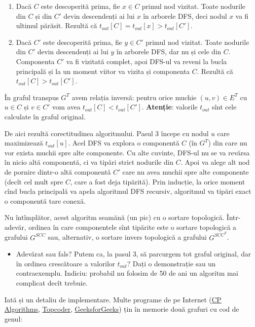 \documentclass[../main.tex]{subfiles}
\begin{document}
\begin{enumerate}
  \item Dacă $C$ este descoperită prima, fie $x \in C$ primul nod vizitat. Toate nodurile din $C$ și din $C'$ devin descendenți ai lui $x$ în arborele DFS, deci nodul $x$ va fi ultimul părăsit. Rezultă că $t_{out}[C] = t_{out}[x] > t_{out}[C']$.

  \item Dacă $C'$ este descoperită prima, fie $y \in C'$ primul nod vizitat. Toate nodurile din $C'$ devin descendenți ai lui $y$ în arborele DFS, dar nu și cele din $C$. Componenta $C'$ va fi vizitată complet, apoi DFS-ul va reveni la bucla principală și la un moment viitor va vizita și componenta $C$. Rezultă că $t_{out}[C] > t_{out}[C']$.
\end{enumerate}

În graful transpus $G^{T}$ avem relația inversă: pentru orice muchie $(u, v) \in E^{T}$ cu $u \in C$ și $v \in C'$ vom avea $t_{out}[C] < t_{out}[C']$. \textbf{Atenție}: valorile $t_{out}$ sînt cele calculate în graful original.

De aici rezultă corectitudinea algoritmului. Pasul 3 începe cu nodul $u$ care maximizează $t_{out}[u]$. Acel DFS va explora o componentă $C$ (în $G^T$) din care nu vor exista muchii spre alte componente. Cu alte cuvinte, DFS-ul nu se va revărsa în nicio altă componentă, ci va tipări strict nodurile din $C$. Apoi va alege alt nod de pornire dintr-o altă componentă $C'$ care nu avea muchii spre alte componente (decît cel mult spre $C$, care a fost deja tipărită). Prin inducție, la orice moment cînd bucla principală va apela algoritmul DFS recursiv, algoritmul va tipări exact o componentă tare conexă.

Nu întîmplător, acest algoritm seamănă (un pic) cu o sortare topologică. Într-adevăr, ordinea în care componentele sînt tipărite este o sortare topologică a grafului $G^{SCC}$ sau, alternativ, o sortare invers topologică a grafului $G^{{SCC}^{T}}$.

\begin{itemize}
  \item Adevărat sau fals? Putem ca, la pasul 3, să parcurgem tot graful original, dar în ordinea crescătoare a valorilor $t_{out}$? Dați o demonstrație sau un contraexemplu. Indiciu: probabil nu folosim de 50 de ani un algoritm mai complicat decît trebuie. 
\end{itemize}

Iată și un detaliu de implementare. Multe programe de pe Internet (\href{https://cp-algorithms.com/graph/strongly-connected-components.html}{CP Algorithms}, \href{https://www.topcoder.com/thrive/articles/kosarajus-algorithm-for-strongly-connected-components}{Topcoder}, \href{https://www.geeksforgeeks.org/strongly-connected-components/}{GeeksforGeeks}) țin în memorie două grafuri cu cod de genul:
\end{document}
